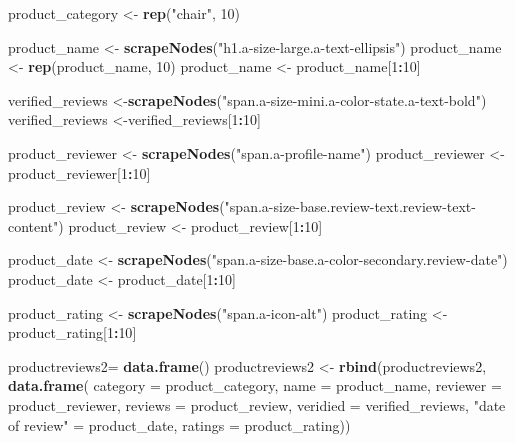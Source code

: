 \documentclass[
]{article}
\newenvironment{Shaded}{\begin{snugshade}}{\end{snugshade}}
\newcommand{\AttributeTok}[1]{\textcolor[rgb]{0.13,0.29,0.53}{#1}}
\newcommand{\DecValTok}[1]{\textcolor[rgb]{0.00,0.00,0.81}{#1}}
\newcommand{\FunctionTok}[1]{\textcolor[rgb]{0.13,0.29,0.53}{\textbf{#1}}}
\newcommand{\NormalTok}[1]{#1}
\newcommand{\OtherTok}[1]{\textcolor[rgb]{0.56,0.35,0.01}{#1}}
\newcommand{\SpecialCharTok}[1]{\textcolor[rgb]{0.81,0.36,0.00}{\textbf{#1}}}
\newcommand{\StringTok}[1]{\textcolor[rgb]{0.31,0.60,0.02}{#1}}
\begin{document}
\begin{Shaded}
\begin{Highlighting}[]
\NormalTok{  product\_category }\OtherTok{\textless{}{-}} \FunctionTok{rep}\NormalTok{(}\StringTok{"chair"}\NormalTok{, }\DecValTok{10}\NormalTok{)}

\NormalTok{  product\_name }\OtherTok{\textless{}{-}} \FunctionTok{scrapeNodes}\NormalTok{(}\StringTok{"h1.a{-}size{-}large.a{-}text{-}ellipsis"}\NormalTok{)}
\NormalTok{  product\_name }\OtherTok{\textless{}{-}} \FunctionTok{rep}\NormalTok{(product\_name, }\DecValTok{10}\NormalTok{)}
\NormalTok{  product\_name }\OtherTok{\textless{}{-}}\NormalTok{ product\_name[}\DecValTok{1}\SpecialCharTok{:}\DecValTok{10}\NormalTok{]}
  
\NormalTok{  verified\_reviews }\OtherTok{\textless{}{-}}\FunctionTok{scrapeNodes}\NormalTok{(}\StringTok{"span.a{-}size{-}mini.a{-}color{-}state.a{-}text{-}bold"}\NormalTok{)}
\NormalTok{  verified\_reviews }\OtherTok{\textless{}{-}}\NormalTok{verified\_reviews[}\DecValTok{1}\SpecialCharTok{:}\DecValTok{10}\NormalTok{]}
  
\NormalTok{  product\_reviewer }\OtherTok{\textless{}{-}} \FunctionTok{scrapeNodes}\NormalTok{(}\StringTok{"span.a{-}profile{-}name"}\NormalTok{)}
\NormalTok{  product\_reviewer }\OtherTok{\textless{}{-}}\NormalTok{ product\_reviewer[}\DecValTok{1}\SpecialCharTok{:}\DecValTok{10}\NormalTok{]}
  
\NormalTok{  product\_review }\OtherTok{\textless{}{-}} \FunctionTok{scrapeNodes}\NormalTok{(}\StringTok{"span.a{-}size{-}base.review{-}text.review{-}text{-}content"}\NormalTok{)}
\NormalTok{  product\_review }\OtherTok{\textless{}{-}}\NormalTok{ product\_review[}\DecValTok{1}\SpecialCharTok{:}\DecValTok{10}\NormalTok{]}
  
\NormalTok{  product\_date }\OtherTok{\textless{}{-}} \FunctionTok{scrapeNodes}\NormalTok{(}\StringTok{"span.a{-}size{-}base.a{-}color{-}secondary.review{-}date"}\NormalTok{)}
\NormalTok{  product\_date }\OtherTok{\textless{}{-}}\NormalTok{ product\_date[}\DecValTok{1}\SpecialCharTok{:}\DecValTok{10}\NormalTok{]}
  
\NormalTok{  product\_rating }\OtherTok{\textless{}{-}} \FunctionTok{scrapeNodes}\NormalTok{(}\StringTok{"span.a{-}icon{-}alt"}\NormalTok{)}
\NormalTok{  product\_rating }\OtherTok{\textless{}{-}}\NormalTok{ product\_rating[}\DecValTok{1}\SpecialCharTok{:}\DecValTok{10}\NormalTok{]}
  
\NormalTok{  productreviews2}\OtherTok{=} \FunctionTok{data.frame}\NormalTok{()}
\NormalTok{  productreviews2 }\OtherTok{\textless{}{-}} \FunctionTok{rbind}\NormalTok{(productreviews2, }\FunctionTok{data.frame}\NormalTok{(}
                      \AttributeTok{category =}\NormalTok{ product\_category,}
                      \AttributeTok{name =}\NormalTok{ product\_name,}
                      \AttributeTok{reviewer =}\NormalTok{ product\_reviewer,}
                      \AttributeTok{reviews =}\NormalTok{ product\_review,}
                      \AttributeTok{veridied =}\NormalTok{ verified\_reviews,}
                      \StringTok{"date of review"} \OtherTok{=}\NormalTok{ product\_date,}
                      \AttributeTok{ratings =}\NormalTok{ product\_rating))}
  

\end{Highlighting}
\end{Shaded}
\end{document}
